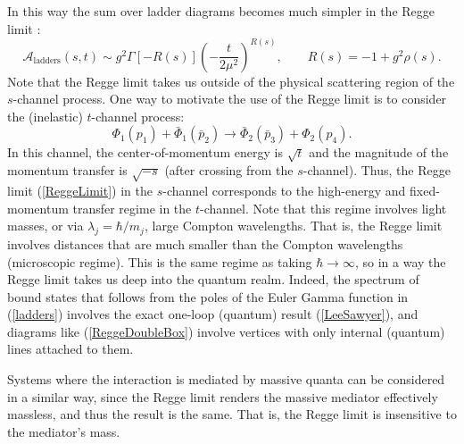 In this way the sum over ladder diagrams becomes much simpler in the Regge limit \cite{LeeSawyer}:
\begin{equation}
	\mathcal{A}_{\text{ladders}}(s, t) \sim g^{2} \Gamma[-R(s)] \left(- \frac{t}{2 \mu^{2}} \right)^{R(s)}, \qquad R(s) = -1 + g^{2} \rho(s) \label{ladders}.
\end{equation}
Note that the Regge limit takes us outside of the physical scattering region of the $s$-channel process. One way to motivate the use of the Regge limit is to consider the (inelastic) $t$-channel process:
\begin{equation}
	\Phi_{1}(p_{1}) + \bar{\Phi}_{1}(\bar{p}_{2}) \longrightarrow \bar{\Phi}_{2}(\bar{p}_{3}) + \Phi_{2}(p_{4}).
\end{equation}
In this channel, the center-of-momentum energy is $\sqrt{t}$ and the magnitude of the momentum transfer is $\sqrt{-s}$ (after crossing from the $s$-channel). Thus, the Regge limit (\ref{ReggeLimit}) in the $s$-channel corresponds to the high-energy and fixed-momentum transfer regime in the $t$-channel. Note that this regime involves light masses, or via $\lambda_{j} = \hbar / m_{j}$, large Compton wavelengths. That is, the Regge limit involves distances that are much smaller than the Compton wavelengths (microscopic regime). This is the same regime as taking $\hbar \rightarrow \infty$, so in a way the Regge limit takes us deep into the quantum realm. Indeed, the spectrum of bound states that follows from the poles of the Euler Gamma function in (\ref{ladders}) involves the exact one-loop (quantum) result (\ref{LeeSawyer}), and diagrams like (\ref{ReggeDoubleBox}) involve vertices with only internal (quantum) lines attached to them.

Systems where the interaction is mediated by massive quanta can be considered in a similar way, since the Regge limit renders the massive mediator effectively massless, and thus the result is the same. That is, the Regge limit is insensitive to the mediator's mass.
